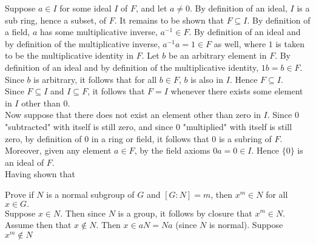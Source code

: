 \documentclass{article}
\theoremstyle{definition}
\begin{document}
Suppose $a\in I$ for some ideal $I$ of $F$, and let $a\ne 0$. 
By definition of an ideal, $I$ is a sub ring, hence a subset, of $F$. It remains to be shown that $F\subseteq I$.
By definition of a field, $a$ has some multiplicative inverse, $a^{-1} \in F$. By definition of an ideal and by definition of the multiplicative inverse, $a^{-1}a = 1\in F$ as well, where $1$ is taken to be the multiplicative identity in $F$. Let $b$ be an arbitrary element in $F$. By definition of an ideal and by definition of the multiplicative identity, $1b = b\in F$. Since $b$ is arbitrary, it follows that for all $b\in F$, $b$ is also in $I$. Hence $F\subseteq I$.\\
Since $F\subseteq I$ and $I\subseteq F$, it follows that $F = I$ whenever there exists some element in $I$ other than $0$.\\

Now suppose that there does not exist an element other than zero in $I$. Since $0$ "subtracted" with itself is still zero, and since $0$ "multiplied" with itself is still zero, by definition of $0$ in a ring or field, it follows that $0$ is a subring of $F$. Moreover, given any element $a\in F$, by the field axioms $0a = 0 \in I$. Hence $\{0\}$ is an ideal of $F$.\\

Having shown that 



 Prove if $N$ is a normal subgroup of $G$ and $[G : N] = m$, then $x^m \in N$ for all $x \in G.$ \\

 Suppose $x\in N$. Then since $N$ is a group, it follows by closure that $x^m\in N$.\\

Assume then that $x\not \in N$. Then $x\in aN = Na$ (since $N$ is normal). Suppose $x^m\not\in N$
\end{document}
